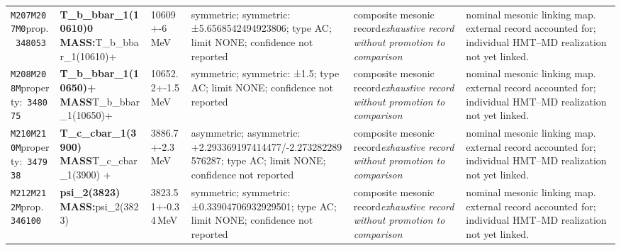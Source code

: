 \begin{landscape}
\begin{longtable}{L{1.85cm}L{4.45cm}L{2.35cm}L{4.05cm}L{3.35cm}L{7.15cm}}
\texttt{M207}\newline \texttt{M207M0}\newline prop.\ \texttt{348053} & \textbf{T\_\allowbreak{}b\_\allowbreak{}bbar\_\allowbreak{}1(10610)0 MASS:}\newline T\_\allowbreak{}b\_\allowbreak{}bbar\_\allowbreak{}1(10610)+ & 10609+-6\,MeV & symmetric; symmetric: ±5.6568542494923806; type AC; limit NONE; confidence not reported & composite mesonic record\newline \emph{exhaustive record without promotion to comparison} & nominal mesonic linking map. external record accounted for; individual HMT--MD realization not yet linked. \\
\texttt{M208}\newline \texttt{M208M}\newline property:\ \texttt{348075} & \textbf{T\_\allowbreak{}b\_\allowbreak{}bbar\_\allowbreak{}1(10650)+ MASS}\newline T\_\allowbreak{}b\_\allowbreak{}bbar\_\allowbreak{}1(10650)+ & 10652.2+-1.5\,MeV & symmetric; symmetric: ±1.5; type AC; limit NONE; confidence not reported & composite mesonic record\newline \emph{exhaustive record without promotion to comparison} & nominal mesonic linking map. external record accounted for; individual HMT--MD realization not yet linked. \\
\texttt{M210}\newline \texttt{M210M}\newline property:\ \texttt{347938} & \textbf{T\_\allowbreak{}c\_\allowbreak{}cbar\_\allowbreak{}1(3900) MASS}\newline T\_\allowbreak{}c\_\allowbreak{}cbar\_\allowbreak{}1(3900) + & 3886.7+-2.3\,MeV & asymmetric; asymmetric: +2.293369197414477/-2.273282289576287; type AC; limit NONE; confidence not reported & composite mesonic record\newline \emph{exhaustive record without promotion to comparison} & nominal mesonic linking map. external record accounted for; individual HMT--MD realization not yet linked. \\
\texttt{M212}\newline \texttt{M212M}\newline prop.\ \texttt{346100} & \textbf{psi\_\allowbreak{}2(3823) MASS:}\newline psi\_\allowbreak{}2(3823) & 3823.51+-0.34\,MeV & symmetric; symmetric: ±0.33904706932929501; type AC; limit NONE; confidence not reported & composite mesonic record\newline \emph{exhaustive record without promotion to comparison} & nominal mesonic linking map. external record accounted for; individual HMT--MD realization not yet linked. \\

\end{longtable}
\end{landscape}
